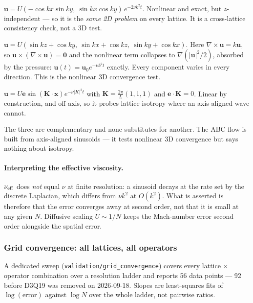 \documentclass[11pt,a4paper]{article}
\newcommand{\code}[1]{\texttt{\small #1}}
\newcommand{\uu}{\bm{u}}
\newcommand{\xx}{\bm{x}}
\begin{document}
\begin{description}[leftmargin=1.6em,itemsep=3pt]
\item[Taylor--Green] $\uu = U(-\cos kx\sin ky,\ \sin kx\cos ky)\,e^{-2\nu k^2t}$.
  Nonlinear and exact, but $z$-independent --- so it is the \emph{same 2D problem}
  on every lattice. It is a cross-lattice consistency check, not a 3D test.
\item[ABC / Beltrami] $\uu = U(\sin kz+\cos ky,\ \sin kx+\cos kz,\ \sin ky+\cos kx)$.
  Here $\nabla\times\uu = k\uu$, so $\uu\times(\nabla\times\uu)=\bm0$ and the
  nonlinear term collapses to $\nabla(|\uu|^2/2)$, absorbed by the pressure:
  $\uu(t)=\uu_0e^{-\nu k^2t}$ exactly. Every component varies in every direction.
  This is the nonlinear 3D convergence test.
\item[Diagonal shear wave] $\uu = U\bm{e}\sin(\bm{K}\!\cdot\!\xx)e^{-\nu|K|^2t}$
  with $\bm{K}=\tfrac{2\pi}{L}(1,1,1)$ and $\bm{e}\!\cdot\!\bm{K}=0$. Linear by
  construction, and off-axis, so it probes lattice isotropy where an axis-aligned
  wave cannot.
\end{description}

\noindent The three are complementary and none substitutes for another. The ABC
flow is built from axis-aligned sinusoids --- it tests nonlinear 3D convergence
but says nothing about isotropy.

\paragraph{Interpreting the effective viscosity.} $\nu_{\rm eff}$ does \emph{not}
equal $\nu$ at finite resolution: a sinusoid decays at the rate set by the
discrete Laplacian, which differs from $\nu k^2$ at $O(k^2)$. What is asserted is
therefore that the error converges away at second order, not that it is small at
any given $N$. Diffusive scaling $U\sim1/N$ keeps the Mach-number error second
order alongside the spatial error.
\subsubsection{Grid convergence: all lattices, all operators}

A dedicated sweep (\code{validation/grid\_convergence}) covers every
lattice $\times$ operator combination over a resolution ladder and reports 56 data
points --- 92 before D3Q19 was removed on 2026-09-18. Slopes are least-squares fits of $\log(\text{error})$ against $\log N$
over the whole ladder, not pairwise ratios.
\end{document}
